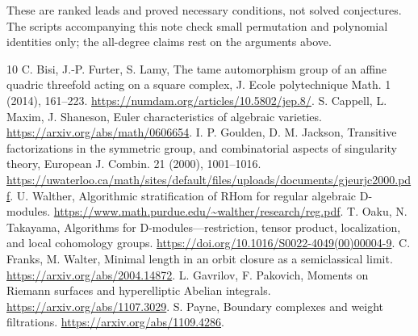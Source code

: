 \documentclass[11pt]{article}
\begin{document}
These are ranked leads and proved necessary conditions, not solved
conjectures. The scripts accompanying this note check small permutation
and polynomial identities only; the all-degree claims rest on the
arguments above.

\begin{thebibliography}{10}
 C. Bisi, J.-P. Furter, S. Lamy,
The tame automorphism group of an affine quadric threefold acting on a
square complex, J. Ecole polytechnique Math. 1 (2014), 161--223.
\url{https://numdam.org/articles/10.5802/jep.8/}.
 S. Cappell, L. Maxim, J. Shaneson,
Euler characteristics of algebraic varieties.
\url{https://arxiv.org/abs/math/0606654}.
 I. P. Goulden, D. M. Jackson,
Transitive factorizations in the symmetric group, and combinatorial
aspects of singularity theory, European J. Combin. 21 (2000), 1001--1016.
\url{https://uwaterloo.ca/math/sites/default/files/uploads/documents/gjeurjc2000.pdf}.
 U. Walther,
Algorithmic stratification of RHom for regular algebraic D-modules.
\url{https://www.math.purdue.edu/~walther/research/reg.pdf}.
 T. Oaku, N. Takayama,
Algorithms for D-modules---restriction, tensor product, localization,
and local cohomology groups.
\url{https://doi.org/10.1016/S0022-4049(00)00004-9}.
 C. Franks, M. Walter,
Minimal length in an orbit closure as a semiclassical limit.
\url{https://arxiv.org/abs/2004.14872}.
 L. Gavrilov, F. Pakovich,
Moments on Riemann surfaces and hyperelliptic Abelian integrals.
\url{https://arxiv.org/abs/1107.3029}.
 S. Payne, Boundary complexes and weight filtrations.
\url{https://arxiv.org/abs/1109.4286}.
\end{thebibliography}
\end{document}

